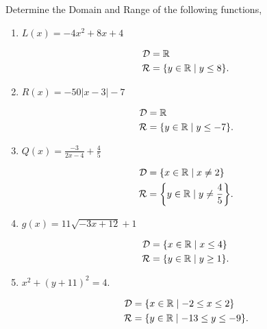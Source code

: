 \documentclass[12pt]{article} %
\begin{document}
\begin{qstn}
  Determine the Domain and Range of the following functions,
  \begin{enumerate}[label=(\alph*)]
    \item $L(x) = -4x^2 + 8x + 4$
      \begin{solution}
      \begin{align*}
        \mathcal{D} &= \mathbb R\\
        \mathcal{R} &= \{y \in \mathbb R \mid y \leq 8\} 
      .\end{align*}
      \end{solution}

    \item $R(x) = -50\left|x - 3\right| - 7$
      \begin{solution}
      \begin{align*}
        \mathcal{D} &= \mathbb R\\
        \mathcal{R} &= \{y \in \mathbb R \mid y \leq -7\} 
      .\end{align*}
      \end{solution}

      \newpage

    \item $Q(x) = \frac{-3}{2x - 4} + \frac{4}{5}$
      \begin{solution}
      \begin{align*}
        \mathcal{D} &= \{x \in \R \mid x \neq 2\} \\
        \mathcal{R} &= \left\{y \in \R \mid y \neq \frac{4}{5}\right\} 
      .\end{align*}
      \end{solution}

    \item $g(x) = 11\sqrt{-3x + 12} + 1$ 
      \begin{solution}
      \begin{align*}
        \mathcal{D} &= \{x \in \R \mid x \leq 4\} \\
        \mathcal{R} &= \left\{y \in \R \mid y \geq 1\right\} 
      .\end{align*}
      \end{solution}

    \item $x^2 + (y + 11)^2 = 4$.
      \begin{solution}
      \begin{align*}
        \mathcal{D} &= \{x \in \mathbb R \mid -2 \leq x \leq 2\}\\
        \mathcal{R} &= \{y \in \mathbb R \mid -13 \leq y \leq -9\} 
      .\end{align*}
        
      \end{solution}
  \end{enumerate}
\end{qstn}
\end{document}

